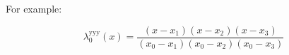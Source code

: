  

For example:

\begin{equation}
\lambda^{\text{yyy}}_0(x) = 
\frac {(x - x_1) (x - x_2) (x - x_3)} 
{(x_0 - x_1) (x_0 - x_2) (x_0 - x_3)}
\end{equation}

% 
% 
% 
% 
 
